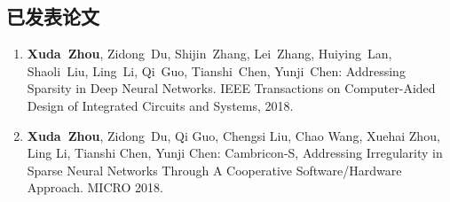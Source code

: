 ﻿\begin{publications}

\section*{已发表论文}
\begin{enumerate}
\item 
\textbf{Xuda~Zhou}, Zidong~Du, Shijin~Zhang, Lei~Zhang, Huiying~Lan, Shaoli~Liu, Ling~Li, Qi~Guo, Tianshi~Chen, Yunji~Chen: Addressing Sparsity in Deep Neural Networks. IEEE Transactions on Computer-Aided Design of Integrated Circuits and Systems, 2018.
\item
\textbf{Xuda~Zhou}, Zidong~Du, Qi Guo, Chengsi Liu, Chao Wang, Xuehai Zhou, Ling Li, Tianshi Chen, Yunji Chen: Cambricon-S, Addressing Irregularity in Sparse Neural Networks Through A Cooperative Software/Hardware Approach. MICRO 2018.
\end{enumerate}


\end{publications}
